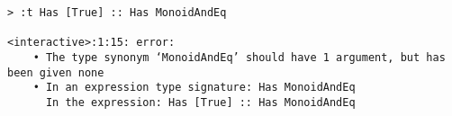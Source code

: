\begin{repl}\begin{lstlisting}
> :t Has [True] :: Has MonoidAndEq

<interactive>:1:15: error:
    • The type synonym ‘MonoidAndEq’ should have 1 argument, but has been given none
    • In an expression type signature: Has MonoidAndEq
      In the expression: Has [True] :: Has MonoidAndEq\end{lstlisting}\end{repl}
